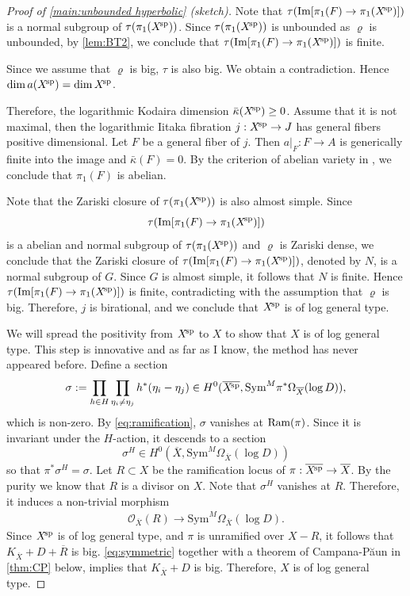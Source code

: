 \documentclass[english]{amsproc}
\theoremstyle{plain}
\theoremstyle{definition}
\theoremstyle{remark}
\theoremstyle{plain}
\numberwithin{equation}{thm} %
\newcommand{\cO}{\mathcal O}
\newcommand{\xsp}{X^{\! \rm sp}}
\def\Sym{{\text{Sym}}}
\begin{document}
\begin{proof}[Proof of \cref{main:unbounded hyperbolic} (sketch)]
		Note that $\tau({\rm Im}[\pi_1(F)\to \pi_1(\xsp)])$  is a normal subgroup of $\tau(\pi_1(\xsp))$.  Since $\tau(\pi_1(\xsp))$ is unbounded as $\varrho$ is unbounded, by \cref{lem:BT2}, we conclude that $\tau({\rm Im}[\pi_1(F)\to \pi_1(\xsp)])$  is finite. 
		
		Since we assume that $\varrho$ is big, $\tau$ is also big. We obtain a contradiction. Hence $\dim a(\xsp)=\dim \xsp$. 
		
		Therefore, the logarithmic Kodaira dimension $\bar{\kappa}(\xsp)\geq 0$. Assume that it is not maximal, then  the logarithmic Iitaka fibration
		$j:\xsp\to J$ has general fibers positive dimensional. Let $F$ be a general fiber  of $j$. Then $a|_F:F\to A$ is generically finite into the image and $\bar{\kappa}(F)=0$. By the criterion of abelian variety in \cite[Lemma 1.4]{CDY25}, we conclude that $\pi_1(F)$ is abelian. 
		
		Note that the Zariski closure of $\tau(\pi_1(\xsp))$ is also almost simple. 	Since \[\tau({\rm Im}[\pi_1(F)\to \pi_1(\xsp)])\]  is a abelian and normal subgroup of $\tau(\pi_1(\xsp))$ and $\varrho$ is Zariski dense, we conclude that the  Zariski closure of $\tau({\rm Im}[\pi_1(F)\to \pi_1(\xsp)])$, denoted by $N$, is  a normal subgroup of $G$. Since $G$ is almost simple, it follows that $N$ is finite. Hence $\tau({\rm Im}[\pi_1(F)\to \pi_1(\xsp)])$  is finite, contradicting with the assumption that $\varrho$ is big. Therefore, $j$ is birational, and we conclude that $\xsp$ is of log general type. 
		
		We will spread the positivity from $\xsp$ to $X$ to show that $X$ is of log general type. This step is innovative and as far as I know, the method has never appeared before.   
		Define a section
		$$
		\sigma:=\prod_{h\in H}\prod_{\eta_i\neq\eta_j}h^*(\eta_i-\eta_j)\in H^0(\overline{\xsp}, \Sym^{M}\pi^*\Omega_{\overline{X}}(\log D)), 
		$$
		which is non-zero. By \eqref{eq:ramification}, $\sigma$  vanishes at  ${\rm Ram}(\pi)$. 
		Since it is invariant under the $H$-action, it descends to a section
		$$
		\sigma^{H}\in H^0(\overline{X}, \Sym^{M}\Omega_{\overline{X}}(\log D))
		$$
		so that $\pi^*\sigma^{H}=\sigma$.   Let $R\subset X$ be the ramification locus of $\pi:\overline{\xsp}\to \overline{X}$. By the purity we know that $R$ is a divisor on $X$. Note that $\sigma^H$ vanishes at $R$. Therefore, it induces a non-trivial morphism
		\begin{align}\label{eq:symmetric}
			\cO_{\overline{X}}(R)\to  \Sym^{M}\Omega_{\overline{X}}(\log D).
		\end{align} 
		Since $\xsp$ is of log general type, and $\pi$ is unramified over $X-R$,  it follows that $K_{\overline{X}}+D+\overline{R}$ is big.   \eqref{eq:symmetric} together with  a theorem of Campana-P\u{a}un  in  \cref{thm:CP} below, implies that $K_{\overline{X}}+D$ is big. Therefore, $X$ is of log general type.
		

\end{proof}
\end{document}
